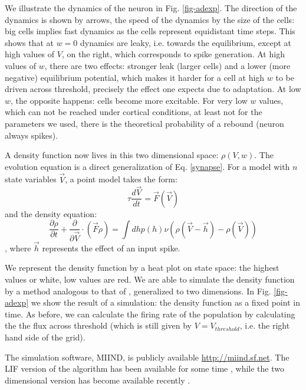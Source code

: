 \documentclass[10pt]{article}
\begin{document}
We illustrate the dynamics of the neuron in Fig. \ref{fig-adexp}.
The direction of the dynamics is shown by arrows, the speed of the dynamics by the size of the cells:
big cells implies fast dynamics as the cells represent equidistant time steps.
This shows that at $w =0$ dynamics are leaky,  i.e. towards the equilibrium, except at high values of $V$, on the right, which corresponds to spike generation.
At high values of $w$, there are two effects: stronger leak (larger cells) and a lower (more negative) equilibrium potential, which makes it harder for a cell at high $w$ to be driven across threshold, precisely the effect one expects due to adaptation.
At low $w$, the opposite happens: cells become more excitable.
For very low $w$ values, which can not be reached under cortical conditions, at least not for the parameters we used, there is the theoretical probability of a rebound (neuron always spikes).

A density function now lives in this two dimensional space: $\rho(V,w)$.
The evolution equation is a direct generalization of Eq. \ref{synapse}.
For a model with $n$ state variables $\vec{V}$, a point model takes the form:
\begin{equation}
\tau \frac{d \vec{V}}{dt} = \vec{F}(\vec{V})
\end{equation}
and the density equation:
\begin{equation}
\frac{\partial \rho}{\partial t} + \frac{\partial}{\partial \vec{V}} \cdot ( \vec{F} \rho) = \int dh p(h) \nu (\rho(\vec{V} - \vec{h}) -\rho(\vec{V}))
\end{equation},
where $\vec{h}$ represents the effect of an input spike.

We represent the density function by a heat plot on state space: the highest values or white, low values are red.
We are able to simulate the density function by a method analogous to that of \cite{dekamps2013,iyer2013}, generalized to two dimensions.
In Fig. \ref{fig-adexp} we show the result of a simulation: the density function as a fixed point in time.
As before, we can calculate the firing rate of the population by calculating the the flux across threshold (which is still given by $V= V_{threshold}$, i.e. the right hand side of the grid).

The simulation software, MIIND, is publicly available \url{http://miind.sf.net}. The LIF version of the algorithm has been available for some time \cite{dekamps2008}, while the two dimensional version has become available recently \cite{dekamps2017b}.
\end{document}
